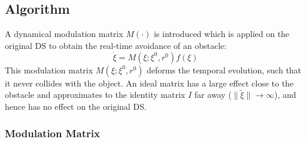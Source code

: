 \subsection{Algorithm}
A dynamical modulation matrix $M(\cdot)$ is introduced which is applied on the original DS to obtain the real-time avoidance of an obstacle:
\begin{equation}
\dot \xi = M(\xi; \xi^0, r^0 ) f(\xi) \label{eq:modulatedDS}
\end{equation}
This modulation matrix $M(\xi; \xi^0, r^0 )$ deforms the temporal evolution, such that it never collides with the object. An ideal matrix has a large effect close to the obstacle and approximates to the identity matrix $I$ far away ($\| \tilde \xi \| \rightarrow \infty$), and hence has no effect on the original DS.

\subsubsection{Modulation Matrix}

